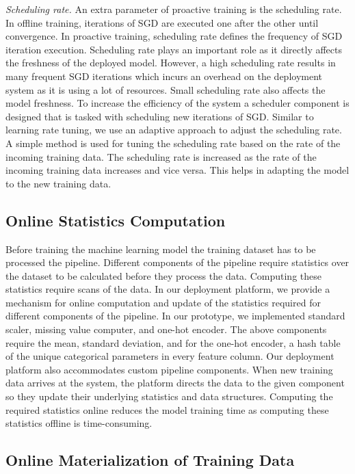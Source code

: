 \textit{Scheduling rate.}
An extra parameter of proactive training is the scheduling rate.
In offline training, iterations of SGD are executed one after the other until convergence.
In proactive training, scheduling rate defines the frequency of SGD iteration execution.
Scheduling rate plays an important role as it directly affects the freshness of the deployed model.
However, a high scheduling rate results in many frequent SGD iterations which incurs an overhead on the deployment system as it is using a lot of resources.
Small scheduling rate also affects the model freshness.
To increase the efficiency of the system a scheduler component is designed that is tasked with scheduling new iterations of SGD.
Similar to learning rate tuning, we use an adaptive approach to adjust the scheduling rate.
A simple method is used for tuning the scheduling rate based on the rate of the incoming training data.
The scheduling rate is increased as the rate of the incoming training data increases and vice versa.
This helps in adapting the model to the new training data.

\subsection{Online Statistics Computation}
Before training the machine learning model the training dataset has to be processed the pipeline.
Different components of the pipeline require statistics over the dataset to be calculated before they process the data.
Computing these statistics require scans of the data.
In our deployment platform, we provide a mechanism for online computation and update of the statistics required for different components of the pipeline.
In our prototype, we implemented standard scaler, missing value computer, and one-hot encoder.
The above components require the mean, standard deviation, and for the one-hot encoder, a hash table of the unique categorical parameters in every feature column.
Our deployment platform also accommodates custom pipeline components.
When new training data arrives at the system, the platform directs the data to the given component so they update their underlying statistics and data structures.
Computing the required statistics online reduces the model training time as computing these statistics offline is time-consuming.

\subsection{Online Materialization of Training Data}

